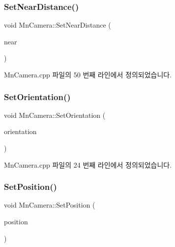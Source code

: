 \mbox{\label{class_m_n_l_1_1_mn_camera_adb743c4f0499bc4b4346d39c1739cdb3}} 
\subsubsection{\texorpdfstring{Set\+Near\+Distance()}{SetNearDistance()}}
{\footnotesize\ttfamily void Mn\+Camera\+::\+Set\+Near\+Distance (\begin{DoxyParamCaption}\item[{float}]{near }\end{DoxyParamCaption})}



Mn\+Camera.\+cpp 파일의 50 번째 라인에서 정의되었습니다.

\mbox{\label{class_m_n_l_1_1_mn_camera_ad9d9cc078cdeda1d5a8ef138a063c46f}} 
\subsubsection{\texorpdfstring{Set\+Orientation()}{SetOrientation()}}
{\footnotesize\ttfamily void Mn\+Camera\+::\+Set\+Orientation (\begin{DoxyParamCaption}\item[{const Direct\+X\+::\+Simple\+Math\+::\+Vector3 \&}]{orientation }\end{DoxyParamCaption})}



Mn\+Camera.\+cpp 파일의 24 번째 라인에서 정의되었습니다.

\mbox{\label{class_m_n_l_1_1_mn_camera_ab15d02ee68e0588a96a0c44ac486cd18}} 
\subsubsection{\texorpdfstring{Set\+Position()}{SetPosition()}}
{\footnotesize\ttfamily void Mn\+Camera\+::\+Set\+Position (\begin{DoxyParamCaption}\item[{const Direct\+X\+::\+Simple\+Math\+::\+Vector3 \&}]{position }\end{DoxyParamCaption})}



